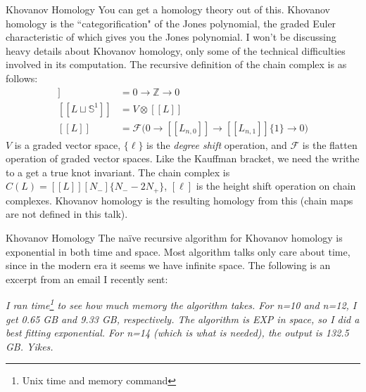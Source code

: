\documentclass{beamer}
\begin{document}
    \begin{frame}{Khovanov Homology}
        You can get a homology theory out of this. Khovanov homology is the
        ``categorification" of the Jones polynomial, the graded Euler
        characteristic of which gives you the Jones polynomial. I won't be
        discussing heavy details about Khovanov homology, only some of the
        technical difficulties involved in its computation.
        The recursive definition of the chain complex is as follows:
        \begin{align}
            [[\emptyset]]&=0\rightarrow\mathbb{Z}\rightarrow{0}\\
            [[L\sqcup\mathbb{S}^{1}]]&=V\otimes[[L]]\\
            [[L]]&=\mathcal{F}\big(
                0\rightarrow[[L_{n,0}]]\rightarrow[[L_{n,1}]]\{1\}\rightarrow{0}
            \big)
        \end{align}
        $V$ is a graded vector space, $\{\ell\}$ is the
        \textit{degree shift} operation, and $\mathcal{F}$ is the flatten
        operation of graded vector spaces. Like the Kauffman bracket, we need
        the writhe to a get a true knot invariant. The chain complex is
        $C(L)=[[L]][N_{-}]\{N_{-}-2N_{+}\}$, $[\ell]$ is the height shift
        operation on chain complexes. Khovanov homology is the resulting
        homology from this (chain maps are not defined in this talk).
    \end{frame}
    \begin{frame}{Khovanov Homology}
        The na\"{i}ve recursive algorithm for Khovanov homology is exponential
        in both time and space. Most algorithm talks only care about time,
        since in the modern era it seems we have infinite space. The following
        is an excerpt from an email I recently sent:
        \begin{flushright}
            \textit{
                I ran time\footnote{Unix time and memory command}
                to see how much memory the algorithm takes.
                For n=10 and n=12, I get 0.65 GB and 9.33 GB, respectively.
                The algorithm is EXP in space, so I did a best fitting
                exponential. For n=14 (which is what is needed), the output is
                132.5 GB. Yikes.
            }
        \end{flushright}
    \end{frame}
\end{document}
